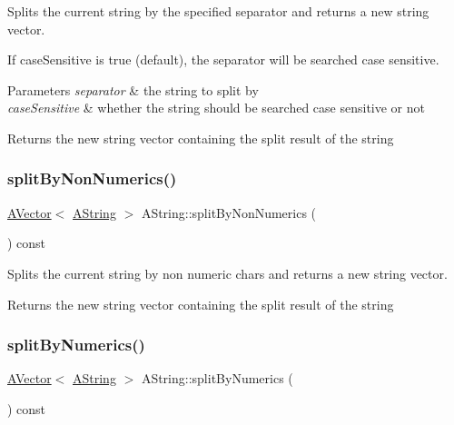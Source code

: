 Splits the current string by the specified separator and returns a new string vector. 

If case\+Sensitive is true (default), the separator will be searched case sensitive.


\begin{DoxyParams}{Parameters}
{\em separator} & the string to split by \\
\hline
{\em case\+Sensitive} & whether the string should be searched case sensitive or not \\
\hline
\end{DoxyParams}
\begin{DoxyReturn}{Returns}
the new string vector containing the split result of the string 
\end{DoxyReturn}
\mbox{\label{class_a_string_ab7375bf0b88b5923385b4cdc8fb02af8}} 
\subsubsection{\texorpdfstring{splitByNonNumerics()}{splitByNonNumerics()}}
{\footnotesize\ttfamily \mbox{\hyperlink{class_a_vector}{A\+Vector}}$<$ \mbox{\hyperlink{class_a_string}{A\+String}} $>$ A\+String\+::split\+By\+Non\+Numerics (\begin{DoxyParamCaption}{ }\end{DoxyParamCaption}) const}



Splits the current string by non numeric chars and returns a new string vector. 

\begin{DoxyReturn}{Returns}
the new string vector containing the split result of the string 
\end{DoxyReturn}
\mbox{\label{class_a_string_a06ca78b1328505ba7c29ea2d1618ef6c}} 
\subsubsection{\texorpdfstring{splitByNumerics()}{splitByNumerics()}}
{\footnotesize\ttfamily \mbox{\hyperlink{class_a_vector}{A\+Vector}}$<$ \mbox{\hyperlink{class_a_string}{A\+String}} $>$ A\+String\+::split\+By\+Numerics (\begin{DoxyParamCaption}{ }\end{DoxyParamCaption}) const}



